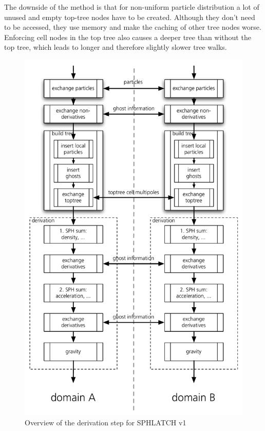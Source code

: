The downside of the method is that for non-uniform particle distribution a lot of unused and empty top-tree nodes have to be created. Although they don't need to be accessed, they use memory and make the caching of other tree nodes worse. Enforcing cell nodes in the top tree also causes a deeper tree than without the top tree, which leads to longer and therefore slightly slower tree walks.

\begin{figure}[htbp]
\begin{center}
\includegraphics[scale=0.6]{21algo_sphlatch01.pdf}
\caption{Overview of the derivation step for SPHLATCH v1}
\label{ch02_fig21}
\end{center}
\end{figure}

